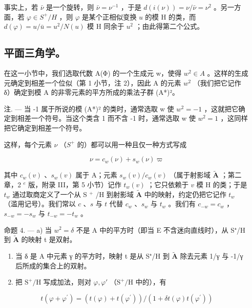 事实上，若 \(\bar{\nu}\) 是一个旋转，则 \(\bar{\nu} = \nu^{-1}\) ，于是 \(d(i(\nu)) = \nu/\bar{\nu} = \nu^{2}\) 。另一方面，若 \(\varphi \in S^{+}/H\) ，则 \(\varphi\) 是某个正相似变换 \(u\) 的模 H 的类，而 \(d(\varphi) = u/\bar{u} = u^{2}/N(u)\) 模 H 同余于 \(u^{2}\) ；由此得第二个公式。

\subsection{平面三角学。}

在这一小节中，我们选取代数 A(Φ) 的一个生成元 w，使得 \(w^{2} \in A\) 。这样的生成元确定到相差一个位似（第 1 小节，注 2），因此 A 的元素 \(w^{2}\) （我们把它记作 δ）确定到模 A 的非零元素的平方所成的乘法子群 (A*)²。

注. — 当 -1 属于所说的模 (A*)² 的类时，通常选取 w 使 \(w^{2} = -1\) ，这就把它确定到相差一个符号。当这个类含 1 而不含 -1 时，通常选取 w 使 \(w^{2} = 1\) ，这同样把它确定到相差一个符号。

这样，每个元素 \(\nu\) （\(S^{+}\) 的）都可以用一种且仅一种方式写成

\[
\nu = c _ {w} (\nu) + s _ {w} (\nu) \varpi\tag{1}
\]

其中 \(c_w(v)\) 、\(s_w(v)\) 属于 A；元素 \(s_w(v)/c_w(v)\) （属于射影域 \(\tilde{\mathbf{A}}\) ；第二章，2 \(^{e}\) 版，附录 III，第 5 小节）记作 \(t_w(v)\) ；它只依赖于 \(v\) 模 H 的类；于是 \(t_w\) 通过取商定义了一个从 S \(^{+}\) /H 到射影域 \(\tilde{\mathbf{A}}\) 中的映射，约定仍把它记作 \(t_w\) （滥用记号）。我们常以 \(c\) 、\(s\) 与 \(t\) 代替 \(c_w\) 、\(s_w\) 与 \(t_w\) 。我们有 \(c_{-w} = c_w\) ，\(s_{-w} = -s_w\) 与 \(t_{-w} = -t_w\) 。

命题 4. — a) 当 \(w^2 = \delta\) 不是 A 中的平方时（即当 E 不含迷向直线时），从 S⁺/H 到 \(\tilde{\mathbf{A}}\) 的映射 t 是双射。

\begin{enumerate}
\def\labelenumi{\alph{enumi})}
\setcounter{enumi}{1}
\item
  当 δ 是 A 中元素 γ 的平方时，映射 t 是从 S⁺/H 到 \(\tilde{\mathbf{A}}\) 除去元素 1/γ 与 -1/γ 后所成的集合上的双射。
\item
  把 \(\mathrm{S}^{+}/\mathrm{H}\) 写成加法，则对 \(\varphi, \varphi'\) （\(\mathrm{S}^{+}/\mathrm{H}\) 中的），有
\end{enumerate}

\[
t (\varphi + \varphi^ {\prime}) = (t (\varphi) + t (\varphi^ {\prime})) / (1 + \delta t (\varphi) t (\varphi^ {\prime}))\tag{2}
\]

